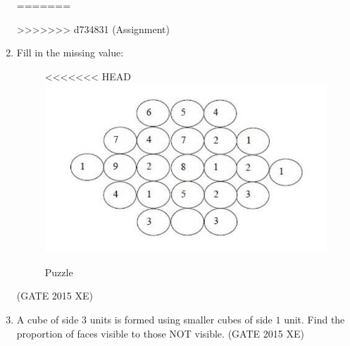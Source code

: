 \documentclass[journal,12pt,onecolumn]{IEEEtran}
\begin{document}
\begin{enumerate}
=======

\vspace{0.5cm}
>>>>>>> d734831 (Assignment)

\item Fill in the missing value:
\begin{figure}[htbp]
  \centering
<<<<<<< HEAD
  \includegraphics[width=.6\columnwidth]{figs/GA/fig1.png}
  \caption{Puzzle}
  \label{fig:figs/GA/fig1}
\end{figure}

\hfill{(GATE 2015 XE)} \\


\item A cube of side $3$ units is formed using smaller cubes of side $1$ unit. Find the proportion of faces visible to those NOT visible.
\hfill{(GATE 2015 XE)} 
\begin{multicols}{4}
\end{multicols}
\end{enumerate}
\end{document}
